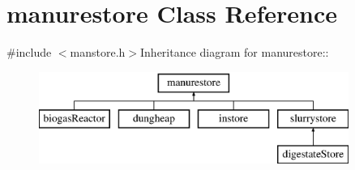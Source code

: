 \hypertarget{classmanurestore}{
\section{manurestore Class Reference}
\label{classmanurestore}
}


{\ttfamily \#include $<$manstore.h$>$}Inheritance diagram for manurestore::\begin{figure}[H]
\begin{center}
\leavevmode
\includegraphics[height=3cm]{classmanurestore}
\end{center}
\end{figure}
